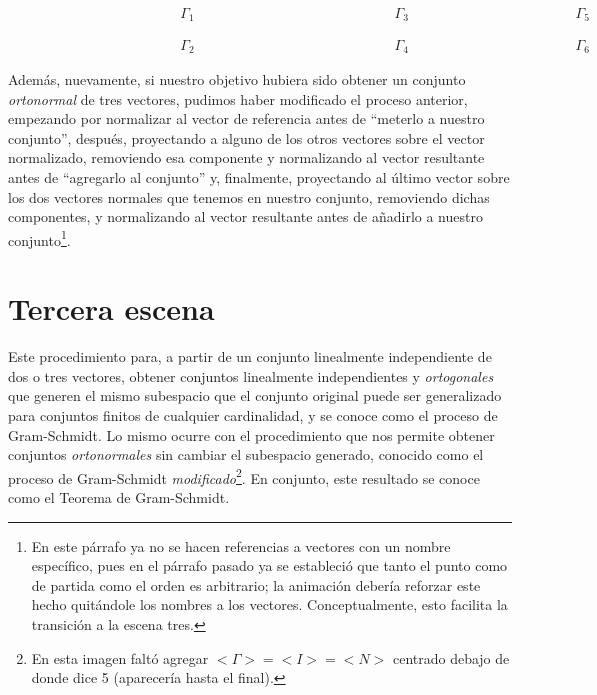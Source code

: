 \documentclass[12pt,dvipsnames]{article}
\numberwithin{equation}{section}
\begin{document}
\begin{align*}
    \hspace{5cm}\Gamma_1 \hspace{6cm}\Gamma_3 \hspace{5cm}\Gamma_5 \\
    \\
    \\
    \hspace{5cm}\Gamma_2 \hspace{6cm}\Gamma_4 \hspace{5cm}\Gamma_6
\end{align*}

Además, nuevamente, si nuestro objetivo hubiera sido obtener un conjunto \emph{ortonormal} de tres vectores, pudimos haber modificado el proceso anterior, empezando por normalizar al vector de referencia antes de ``meterlo a nuestro conjunto'', después, proyectando a alguno de los otros vectores sobre el vector normalizado, removiendo esa componente y normalizando al vector resultante antes de ``agregarlo al conjunto'' y, finalmente, proyectando al último vector sobre los dos vectores normales que tenemos en nuestro conjunto, removiendo dichas componentes, y normalizando al vector resultante antes de añadirlo a nuestro conjunto\footnote{En este párrafo ya no se hacen referencias a vectores con un nombre específico, pues en el párrafo pasado ya se estableció que tanto el punto como de partida como el orden es arbitrario; la animación debería reforzar este hecho quitándole los nombres a los vectores. Conceptualmente, esto facilita la transición a la escena tres.}.


\newpage
\section{Tercera escena}

Este procedimiento para, a partir de un conjunto linealmente independiente de dos o tres vectores, obtener conjuntos linealmente independientes y \emph{ortogonales} que generen el mismo subespacio que el conjunto original puede ser generalizado para conjuntos finitos de cualquier cardinalidad, y se conoce como el proceso de Gram-Schmidt. Lo mismo ocurre con el procedimiento que nos permite obtener conjuntos \emph{ortonormales} sin cambiar el subespacio generado, conocido como el proceso de Gram-Schmidt \emph{modificado}\footnote{En esta imagen faltó agregar $<\Gamma>=<I>=<N>$ centrado debajo de donde dice 5 (aparecería hasta el final).}. En conjunto, este resultado se conoce como el Teorema de Gram-Schmidt.
\end{document}

